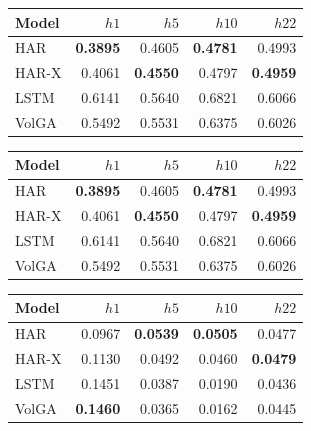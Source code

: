 \begin{tabular}{lrrrr}
\toprule
Model & $h1$ & $h5$ & $h10$ & $h22$ \\
\midrule
HAR & \textbf{0.3895} & 0.4605 & \textbf{0.4781} & 0.4993 \\
HAR-X & 0.4061 & \textbf{0.4550} & 0.4797 & \textbf{0.4959} \\
LSTM & 0.6141 & 0.5640 & 0.6821 & 0.6066 \\
VolGA & 0.5492 & 0.5531 & 0.6375 & 0.6026 \\
\bottomrule
\end{tabular}

\begin{tabular}{lrrrr}
\toprule
Model & $h1$ & $h5$ & $h10$ & $h22$ \\
\midrule
HAR & \textbf{0.3895} & 0.4605 & \textbf{0.4781} & 0.4993 \\
HAR-X & 0.4061 & \textbf{0.4550} & 0.4797 & \textbf{0.4959} \\
LSTM & 0.6141 & 0.5640 & 0.6821 & 0.6066 \\
VolGA & 0.5492 & 0.5531 & 0.6375 & 0.6026 \\
\bottomrule
\end{tabular}

\begin{tabular}{lrrrr}
\toprule
Model & $h1$ & $h5$ & $h10$ & $h22$ \\
\midrule
HAR & 0.0967 & \textbf{0.0539} & \textbf{0.0505} & 0.0477 \\
HAR-X & 0.1130 & 0.0492 & 0.0460 & \textbf{0.0479} \\
LSTM & 0.1451 & 0.0387 & 0.0190 & 0.0436 \\
VolGA & \textbf{0.1460} & 0.0365 & 0.0162 & 0.0445 \\
\bottomrule
\end{tabular}
